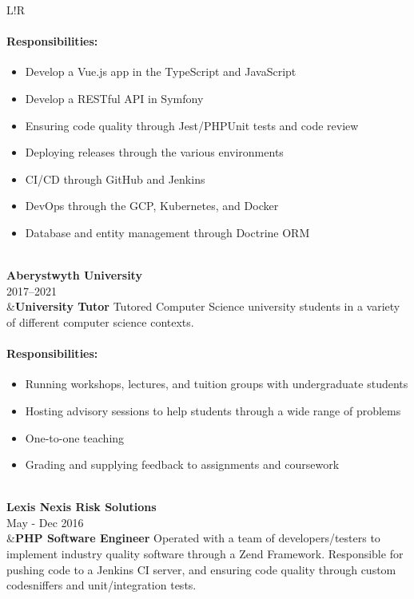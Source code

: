 \documentclass[10pt]{article}
\newcommand\VRule{\color{lightgray}\vrule width 0.5pt}
\begin{document}
\begin{longtable}{L!{\VRule}R}
\vspace{-3mm}
\paragraph{Responsibilities:}
\begin{itemize}[noitemsep,topsep=0pt]
	\item Develop a Vue.js app in the TypeScript and JavaScript
	\item Develop a RESTful API in Symfony
	\item Ensuring code quality through Jest/PHPUnit tests and code review
	\item Deploying releases through the various environments
	\item CI/CD through GitHub and Jenkins
	\item DevOps through the GCP, Kubernetes, and Docker
	\item Database and entity management through Doctrine ORM
\end{itemize}
\\

{\bf Aberystwyth University}\\
2017--2021\\
&{\bf University Tutor}\newline
Tutored Computer Science university students in a variety of different computer science contexts.

\vspace{-3mm}
\paragraph{Responsibilities:}
\begin{itemize}[noitemsep,topsep=0pt]
	\item Running workshops, lectures, and tuition groups with undergraduate students
	\item Hosting advisory sessions to help students through a wide range of problems
	\item One-to-one teaching
	\item Grading and supplying feedback to assignments and coursework
\end{itemize}
\\

{\bf Lexis Nexis Risk Solutions}\\
May - Dec 2016\\
&{\bf PHP Software Engineer}\newline
Operated with a team of developers/testers to implement industry quality software through a Zend Framework. Responsible for pushing code to a Jenkins CI server, and ensuring code quality through custom codesniffers and unit/integration tests.


\end{longtable}
\end{document}
